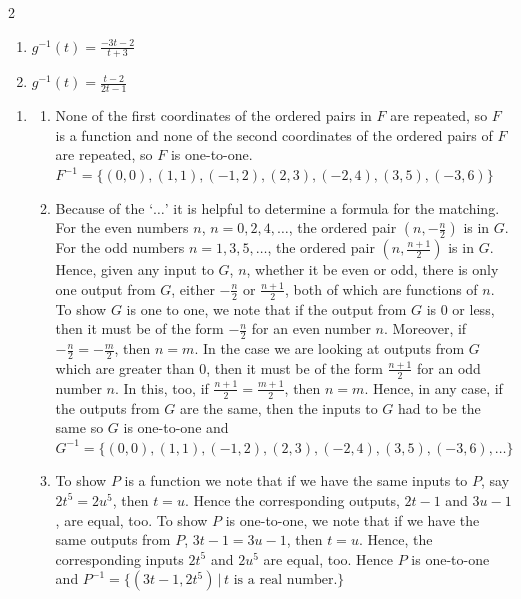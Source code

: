 \documentclass{ximera}
\begin{document}
\begin{multicols}{2}
\begin{enumerate}
\setcounter{enumi}{\value{HW}}

\item $g^{-1}(t) = \frac{-3t - 2}{t + 3}$
\item $g^{-1}(t) = \frac{t-2}{2t-1}$ 

\setcounter{HW}{\value{enumi}}
\end{enumerate}
\end{multicols}

\begin{enumerate}
\setcounter{enumi}{\value{HW}}

\item

\begin{enumerate}

\item  None of the first coordinates of the ordered pairs in $F$ are repeated, so $F$ is a function and none of the second coordinates of the ordered pairs of $F$ are repeated, so $F$ is one-to-one.   $F^{-1} = \{ (0,0), (1,1), (-1,2), (2,3), (-2,4), (3,5), (-3,6)  \}$

\item  Because of the `$\ldots$' it is helpful to determine a formula for the matching. For the even numbers $n$, $n = 0, 2, 4, \ldots$, the ordered pair $\left(n, -\frac{n}{2} \right)$ is in $G$.  For the odd numbers  $n = 1, 3, 5, \ldots$, the ordered pair $\left(n, \frac{n+1}{2} \right)$ is in $G$.  Hence, given any input to $G$, $n$, whether it be even or odd, there is only one output from $G$, either $-\frac{n}{2}$ or $\frac{n+1}{2}$, both of which are functions of $n$. To show $G$ is one to one, we note that if the output from $G$ is $0$ or less, then it must be of the form $-\frac{n}{2}$ for an even number $n$.  Moreover, if $-\frac{n}{2} = -\frac{m}{2}$, then $n = m$. In the case we are looking at outputs from $G$ which are greater than $0$, then it must be of the form $\frac{n+1}{2}$ for an odd number $n$.  In this, too, if  $\frac{n+1}{2} = \frac{m+1}{2}$, then $n = m$.  Hence, in any case, if the outputs from $G$ are the same, then the inputs to $G$ had to be the same so  $G$ is one-to-one and $G^{-1} = \{ (0,0), (1,1), (-1,2), (2,3), (-2,4), (3,5), (-3,6), \ldots \}$  


\item  To show $P$ is a function we note that if we have the same inputs to $P$, say $2t^{5} = 2u^{5}$, then $t = u$.  Hence the corresponding outputs, $2t-1$ and $3u-1$, are equal, too. To show $P$ is one-to-one, we note that if we have the same outputs from $P$, $3t-1 = 3u-1$, then $t = u$.  Hence, the corresponding  inputs $2t^5$  and $2u^5$ are equal, too. Hence $P$ is one-to-one and $P^{-1} = \{ (3t-1, 2t^5) \, | \, \text{$t$ is a real number.} \}$


\end{enumerate}
\end{enumerate}
\end{document}
